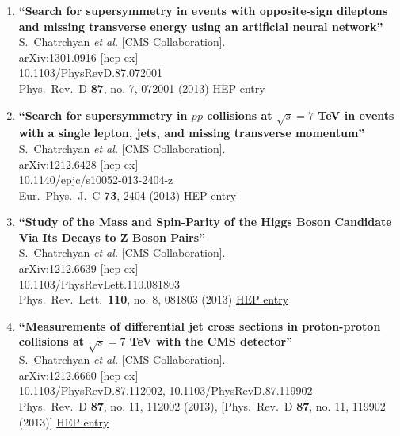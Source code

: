 \documentclass{article}
\begin{document}
\begin{enumerate}
\item%
{\bf ``Search for supersymmetry in events with opposite-sign dileptons and missing transverse energy using an artificial neural network''}
  \\{}S.~Chatrchyan {\it et al.} [CMS Collaboration].
  \\{}arXiv:1301.0916 [hep-ex]
    \\{}10.1103/PhysRevD.87.072001
\\{}Phys.\ Rev.\ D {\bf 87}, no. 7, 072001 (2013) %
\href{http://inspirehep.net/record/1209556}{HEP entry}


\item%
{\bf ``Search for supersymmetry in $pp$ collisions at $\sqrt{s}=7$ TeV in events with a single lepton, jets, and missing transverse momentum''}
  \\{}S.~Chatrchyan {\it et al.} [CMS Collaboration].
  \\{}arXiv:1212.6428 [hep-ex]
    \\{}10.1140/epjc/s10052-013-2404-z
\\{}Eur.\ Phys.\ J.\ C {\bf 73}, 2404 (2013) %
\href{http://inspirehep.net/record/1208988}{HEP entry}


\item%
{\bf ``Study of the Mass and Spin-Parity of the Higgs Boson Candidate Via Its Decays to Z Boson Pairs''}
  \\{}S.~Chatrchyan {\it et al.} [CMS Collaboration].
  \\{}arXiv:1212.6639 [hep-ex]
    \\{}10.1103/PhysRevLett.110.081803
\\{}Phys.\ Rev.\ Lett.\  {\bf 110}, no. 8, 081803 (2013) %
\href{http://inspirehep.net/record/1208931}{HEP entry}


\item%
{\bf ``Measurements of differential jet cross sections in proton-proton collisions at $\sqrt{s}=7$ TeV with the CMS detector''}
  \\{}S.~Chatrchyan {\it et al.} [CMS Collaboration].
  \\{}arXiv:1212.6660 [hep-ex]
    \\{}10.1103/PhysRevD.87.112002, 10.1103/PhysRevD.87.119902
\\{}Phys.\ Rev.\ D {\bf 87}, no. 11, 112002 (2013), [Phys.\ Rev.\ D {\bf 87}, no. 11, 119902 (2013)] %
\href{http://inspirehep.net/record/1208923}{HEP entry}



\end{enumerate}
\end{document}
